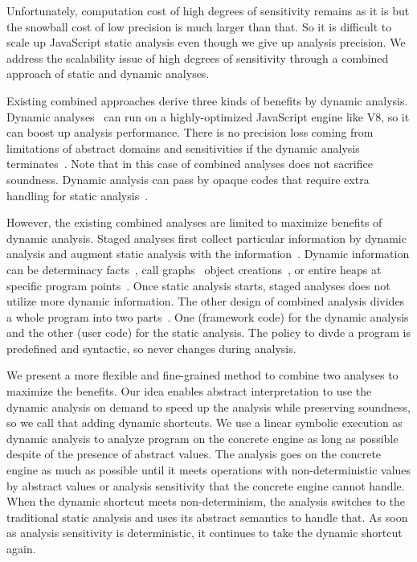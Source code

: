 Unfortunately, computation cost of high degrees of sensitivity remains as it is
but the snowball cost of low precision is much larger than that.
So it is difficult to scale up JavaScript static analysis even though we give up
analysis precision.
We address the scalability issue of high degrees of sensitivity through a
combined approach of static and dynamic analyses.


Existing combined approaches derive three kinds of benefits by dynamic analysis.
Dynamic analyses~\cite{jalangi, dlint} can run on a highly-optimized
JavaScript engine like V8, so it can boost up analysis performance.
There is no precision loss coming from limitations of abstract domains and
sensitivities if the dynamic analysis terminates~\cite{determinacy, concerto}.
Note that in this case of combined analyses does not sacrifice soundness.
Dynamic analysis can pass by opaque codes that require extra handling for static
analysis~\cite{battles, sra}.


However, the existing combined analyses are limited to maximize benefits of
dynamic analysis.
Staged analyses first collect particular information by dynamic analysis and
augment static analysis with the information~\cite{blendedJava, eha}.
Dynamic information can be determinacy facts~\cite{determinacy}, call graphs~\cite{tunable}
object creations~\cite{blendedJS}, or entire heaps at specific program points~\cite{battles}.
Once static analysis starts, staged analyses does not utilize more dynamic information.
The other design of combined analysis divides a whole program into two parts~\cite{concerto}.
One (framework code) for the dynamic analysis  and the other (user code) for the
static analysis.
The policy to divde a program is predefined and syntactic, so never changes
during analysis.


We present a more flexible and fine-grained method to combine two analyses to
maximize the benefits.
Our idea enables abstract interpretation to use the dynamic analysis on demand
to speed up the analysis while preserving soundness, so we call that adding
dynamic shortcuts.
We use a linear symbolic execution as dynamic analysis to analyze program on the
concrete engine as long as possible despite of the presence of abstract values.
The analysis goes on the concrete engine as much as possible until it meets
operations with non-deterministic values by abstract values or analysis
sensitivity that the concrete engine cannot handle.
When the dynamic shortcut meets non-determinism, the analysis switches to
the traditional static analysis and uses its abstract semantics to handle that.
As soon as analysis sensitivity is deterministic, it continues to take the
dynamic shortcut again.

